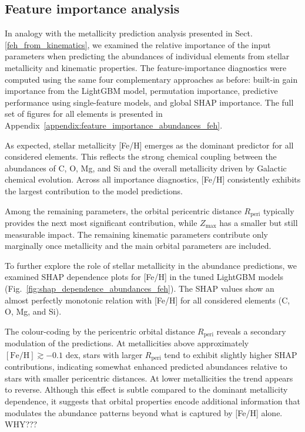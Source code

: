 \documentclass{aa}
\begin{document}
\subsection{Feature importance analysis}
\label{main_feat_imp_abund_feh}

In analogy with the metallicity prediction analysis presented in Sect.\ref{feh_from_kinematics}, we examined the relative importance of the input parameters when predicting the abundances of individual elements from stellar metallicity and kinematic properties. The feature-importance diagnostics were computed using the same four complementary approaches as before: built-in gain importance from the LightGBM model, permutation importance, predictive performance using single-feature models, and global SHAP importance. The full set of figures for all elements is presented in Appendix~\ref{appendix:feature_importance_abundances_feh}.

As expected, stellar metallicity [Fe/H] emerges as the dominant predictor for all considered elements. This reflects the strong chemical coupling between the abundances of C, O, Mg, and Si and the overall metallicity driven by Galactic chemical evolution. Across all importance diagnostics, [Fe/H] consistently exhibits the largest contribution to the model predictions.

Among the remaining parameters, the orbital pericentric distance $R_{\mathrm{peri}}$ typically provides the next most significant contribution, while  $Z_{\max}$ has a smaller but still measurable impact. The remaining kinematic parameters contribute only marginally once metallicity and the main orbital parameters are included.


To further explore the role of stellar metallicity in the abundance predictions, we examined SHAP dependence plots for [Fe/H] in the tuned LightGBM models (Fig.~\ref{fig:shap_dependence_abundances_feh}). The SHAP values show an almost perfectly monotonic relation with [Fe/H] for all considered elements (C, O, Mg, and Si).

The colour-coding by the pericentric orbital distance $R_{\mathrm{peri}}$ reveals a secondary modulation of the predictions. At metallicities above approximately $[\mathrm{Fe/H}] \gtrsim -0.1$ dex, stars with larger $R_{\mathrm{peri}}$ tend to exhibit slightly higher SHAP contributions, indicating somewhat enhanced predicted abundances relative to stars with smaller pericentric distances. At lower metallicities the trend appears to reverse. Although this effect is subtle compared to the dominant metallicity dependence, it suggests that orbital properties encode additional information that modulates the abundance patterns beyond what is captured by [Fe/H] alone. WHY???
\end{document}
